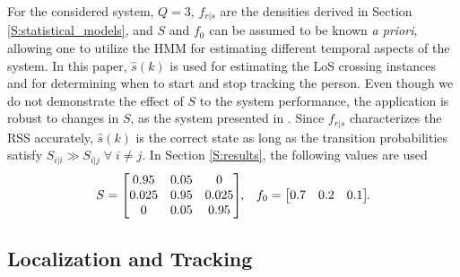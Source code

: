 \documentclass[journal, 10pt, twocolumn, balance]{IEEEtran}
\begin{document}
For the considered system, $Q=3$, $f_{r \vert s}$ are the densities derived in Section \ref{S:statistical_models}, and $S$ and $f_0$ can be assumed to be known \emph{a priori}, allowing one to utilize the HMM for estimating different temporal aspects of the system. In this paper, $\hat{s}(k)$ is used for estimating the LoS crossing instances and for determining when to start and stop tracking the person. Even though we do not demonstrate the effect of $S$ to the system performance, the application is robust to changes in $S$, as the system presented in \cite{kaltiokallio2014}. Since $f_{r \vert s}$ characterizes the RSS accurately, $\hat{s}(k)$ is the correct state as long as the transition probabilities satisfy $S_{i \lvert i} \gg S_{i \lvert j} \; \forall  \; i \neq j$. In Section \ref{S:results}, the following values are used
\begin{equation*}
S = \left[\begin{matrix} 0.95 & 0.05 & 0 \\ 0.025 & 0.95 & 0.025 \\ 0 & 0.05 & 0.95 \end{matrix}\right] \negthickspace\text{,}\quad
f_0 = \left[\begin{matrix} 0.7&0.2&0.1  \end{matrix}\right] \negthickspace\text{.}
\end{equation*}



\subsection{Localization and Tracking}\label{sec:tracking}
\end{document}
